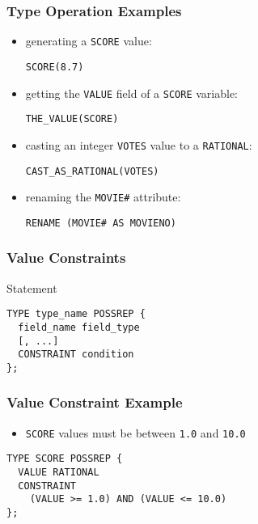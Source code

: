 \documentclass[dvipsnames]{beamer}
\theoremstyle{plain}
\begin{document}
\begin{frame}[fragile]
  \frametitle{Type Operation Examples}

  \begin{example}
    \begin{itemize}
      \item generating a \texttt{SCORE} value:
      \begin{lstlisting}
SCORE(8.7)
      \end{lstlisting}

      \pause
      \item getting the \texttt{VALUE} field of a \texttt{SCORE} variable:
      \begin{lstlisting}
THE_VALUE(SCORE)
      \end{lstlisting}

      \pause
      \item casting an integer \texttt{VOTES} value to a \texttt{RATIONAL}:
      \begin{lstlisting}
CAST_AS_RATIONAL(VOTES)
      \end{lstlisting}

      \pause
      \item renaming the \texttt{MOVIE\#} attribute:
      \begin{lstlisting}
RENAME (MOVIE# AS MOVIENO)
      \end{lstlisting}
    \end{itemize}
  \end{example}
\end{frame}

\begin{frame}[fragile]
  \frametitle{Value Constraints}

  \begin{block}{Statement}
    \begin{lstlisting}
TYPE type_name POSSREP {
  field_name field_type
  [, ...]
  CONSTRAINT condition
};
    \end{lstlisting}
  \end{block}
\end{frame}

\begin{frame}[fragile]
  \frametitle{Value Constraint Example}

  \begin{example}
    \begin{itemize}
      \item \texttt{SCORE} values must be between \texttt{1.0} and \texttt{10.0}
    \end{itemize}

    \begin{lstlisting}
TYPE SCORE POSSREP {
  VALUE RATIONAL
  CONSTRAINT
    (VALUE >= 1.0) AND (VALUE <= 10.0)
};
    \end{lstlisting}
  \end{example}
\end{frame}
\end{document}
